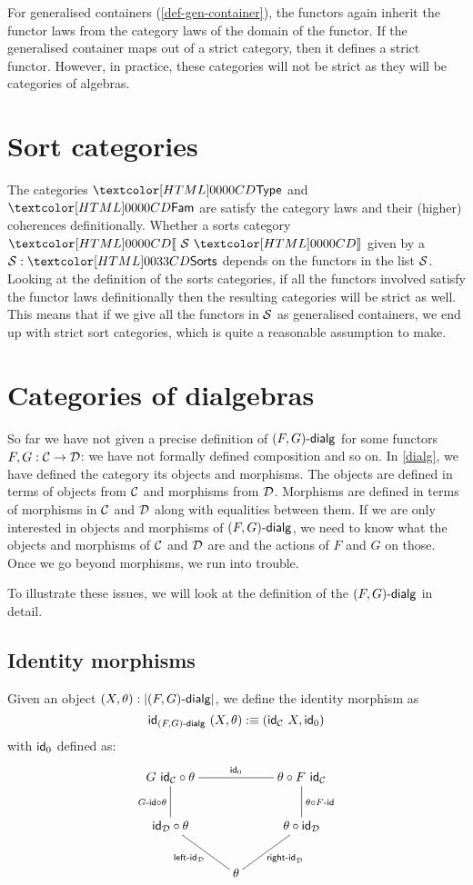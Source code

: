 For generalised containers (\cref{def-gen-container}), the functors
again inherit the functor laws from the category laws of the domain of
the functor. If the generalised container maps out of a strict
category, then it defines a strict functor. However, in practice,
these categories will not be strict as they will be categories of
algebras.

\section{Sort categories}
\label{coherence-sort-categories}

The categories $\Type$ and $\Fam$ are satisfy the category laws and
their (higher) coherences definitionally. Whether a sorts category
$\SortCat{\Ss}$ given by a $\Ss : \sortsty$ depends on the functors in
the list $\mathcal{S}$. Looking at the definition of the sorts categories, if
all the functors involved satisfy the functor laws definitionally then
the resulting categories will be strict as well. This means that if we
give all the functors in $\mathcal{S}$ as generalised containers, we end up
with strict sort categories, which is quite a reasonable assumption to
make.

\section{Categories of dialgebras}

So far we have not given a precise definition of $\dialgcat{F}{G}$ for
some functors $F, G : \mathcal{C} \to \mathcal{D}$: we have not formally defined
composition and so on. In \cref{dialg}, we have defined the category
its objects and morphisms. The objects are defined in terms of objects
from $\mathcal{C}$ and morphisms from $\mathcal{D}$. Morphisms are defined in terms of
morphisms in $\mathcal{C}$ and $\mathcal{D}$ along with equalities between them. If we
are only interested in objects and morphisms of $\dialgcat{F}{G}$, we
need to know what the objects and morphisms of $\mathcal{C}$ and $\mathcal{D}$ are and
the actions of $F$ and $G$ on those. Once we go beyond morphisms, we
run into trouble.

To illustrate these issues, we will look at the definition of the
$\dialgcat{F}{G}$ in detail. 

\subsection{Identity morphisms}

Given an object $(X,\theta) : | \dialgcat{F}{G} |$, we define the
identity morphism as
$$
\id_{\dialgcat{F}{G}}\ (X,\theta) \ddefeq (\id_\Cc\ X , \id_0)
$$
with $\id_0$ defined as:
$$
\xymatrix{
G\ \id_\Cc \circ \theta
\ar@{-}[rr]^{\id_0}
\ar@{-}[d]_{\Gid \circ \theta}
&
&\theta \circ F\ \id_\Cc
\ar@{-}[d]^{\theta \circ \Fid}
\\
\id_\Dd \circ \theta
\ar@{-}[dr]_{\leftid_{\Dd}}
&
&\theta \circ \id_\Dd
\ar@{-}[dl]^{\rightid_{\Dd}}
\\
&\theta
&
}
$$


